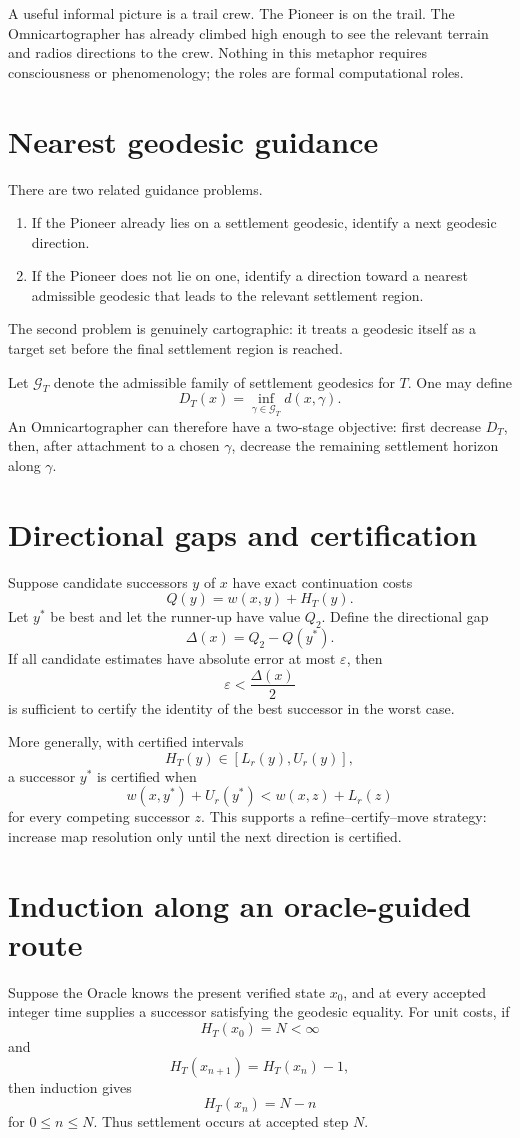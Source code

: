 \documentclass[11pt]{article}
\begin{document}
A useful informal picture is a trail crew. The Pioneer is on the trail. The Omnicartographer has already climbed high enough to see the relevant terrain and radios directions to the crew. Nothing in this metaphor requires consciousness or phenomenology; the roles are formal computational roles.

\section{Nearest geodesic guidance}
There are two related guidance problems.
\begin{enumerate}[label=(\arabic*)]
\item If the Pioneer already lies on a settlement geodesic, identify a next geodesic direction.
\item If the Pioneer does not lie on one, identify a direction toward a nearest admissible geodesic that leads to the relevant settlement region.
\end{enumerate}
The second problem is genuinely cartographic: it treats a geodesic itself as a target set before the final settlement region is reached.

Let $\mathcal G_T$ denote the admissible family of settlement geodesics for $T$. One may define
\[
D_T(x)=\inf_{\gamma\in\mathcal G_T} d(x,\gamma).
\]
An Omnicartographer can therefore have a two-stage objective: first decrease $D_T$, then, after attachment to a chosen $\gamma$, decrease the remaining settlement horizon along $\gamma$.

\section{Directional gaps and certification}
Suppose candidate successors $y$ of $x$ have exact continuation costs
\[
Q(y)=w(x,y)+H_T(y).
\]
Let $y^*$ be best and let the runner-up have value $Q_2$. Define the directional gap
\[
\Delta(x)=Q_2-Q(y^*).
\]
If all candidate estimates have absolute error at most $\varepsilon$, then
\[
\varepsilon<\frac{\Delta(x)}{2}
\]
is sufficient to certify the identity of the best successor in the worst case.

More generally, with certified intervals
\[
H_T(y)\in[L_r(y),U_r(y)],
\]
a successor $y^*$ is certified when
\[
w(x,y^*)+U_r(y^*)<w(x,z)+L_r(z)
\]
for every competing successor $z$. This supports a refine--certify--move strategy: increase map resolution only until the next direction is certified.

\section{Induction along an oracle-guided route}
Suppose the Oracle knows the present verified state $x_0$, and at every accepted integer time supplies a successor satisfying the geodesic equality. For unit costs, if
\[
H_T(x_0)=N<\infty
\]
and
\[
H_T(x_{n+1})=H_T(x_n)-1,
\]
then induction gives
\[
H_T(x_n)=N-n
\]
for $0\le n\le N$. Thus settlement occurs at accepted step $N$.
\end{document}
